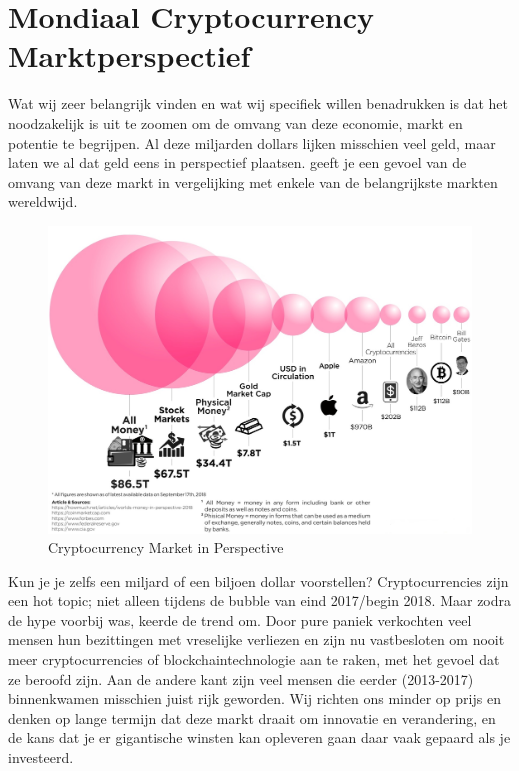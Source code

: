 \section{Mondiaal Cryptocurrency Marktperspectief}

Wat wij zeer belangrijk vinden en wat wij specifiek willen benadrukken is dat het noodzakelijk is uit te zoomen om de omvang van deze economie, markt en potentie te begrijpen. Al deze miljarden dollars lijken misschien veel geld, maar laten we al dat geld eens in perspectief plaatsen.  geeft je een gevoel van de omvang van deze markt in vergelijking met enkele van de belangrijkste markten wereldwijd.

\begin{figure}[htb]
    \centering
    \includegraphics[width=.9\textwidth]{img/ch-iceage/bitcoin-money-economy-in-perspective-2018.jpg}
    \caption{Cryptocurrency Market in Perspective}
    \label{fig:Cryptocurrency market perspective}
\end{figure}

\noindent Kun je je zelfs een miljard of een biljoen dollar voorstellen? Cryptocurrencies zijn een hot topic; niet alleen tijdens de bubble van eind 2017/begin 2018. Maar zodra de hype voorbij was, keerde de trend om. Door pure paniek verkochten veel mensen hun bezittingen met vreselijke verliezen en zijn nu vastbesloten om nooit meer cryptocurrencies of blockchaintechnologie aan te raken, met het gevoel dat ze beroofd zijn. Aan de andere kant zijn veel mensen die eerder (2013-2017) binnenkwamen misschien juist rijk geworden. Wij richten ons minder op prijs en denken op lange termijn dat deze markt draait om innovatie en verandering, en de kans dat je er gigantische winsten kan opleveren gaan daar vaak gepaard als je investeerd. 

